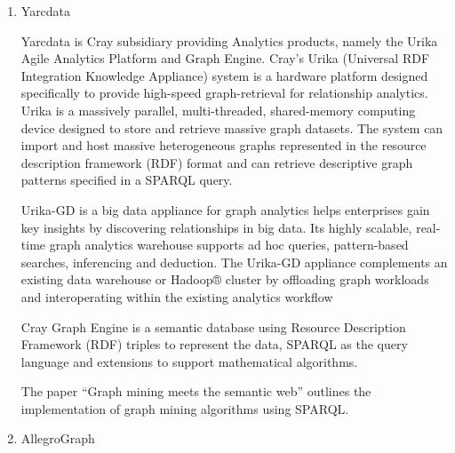 \begin{enumerate}
\item {} 
Yarcdata

Yarcdata is Cray subsidiary providing Analytics
products, namely the Urika Agile Analytics Platform and Graph
Engine. Cray’s Urika (Universal RDF Integration Knowledge
Appliance) system \label{\detokenize{i524/technologies:id455}}{\hyperref[\detokenize{i524/technologies:www-urika-appliance}]{\sphinxcrossref{{[}389{]}}}} is a hardware
platform designed specifically to provide high-speed
graph-retrieval for relationship analytics. Urika is a massively
parallel, multi-threaded, shared-memory computing device designed
to store and retrieve massive graph datasets. The system can
import and host massive heterogeneous graphs represented in the
resource description framework (RDF) format and can retrieve
descriptive graph patterns specified in a SPARQL query.

Urika-GD \label{\detokenize{i524/technologies:id456}}{\hyperref[\detokenize{i524/technologies:techspec-urika-gd}]{\sphinxcrossref{{[}390{]}}}} is a big data appliance for
graph analytics helps enterprises gain key insights by
discovering relationships in big data. Its highly scalable,
real-time graph analytics warehouse supports ad hoc queries,
pattern-based searches, inferencing and deduction. The Urika-GD
appliance complements an existing data warehouse or Hadoop®
cluster by offloading graph workloads and interoperating within
the existing analytics workflow

Cray Graph Engine \label{\detokenize{i524/technologies:id457}}{\hyperref[\detokenize{i524/technologies:paper-graph-data}]{\sphinxcrossref{{[}391{]}}}} is a semantic database
using Resource Description Framework (RDF) triples to represent
the data, SPARQL as the query language and extensions to support
mathematical algorithms.

The paper ``Graph mining meets the semantic web''
\label{\detokenize{i524/technologies:id458}}{\hyperref[\detokenize{i524/technologies:paper-lee2015graph}]{\sphinxcrossref{{[}392{]}}}} outlines the implementation of graph
mining algorithms using SPARQL.

\item {} 
AllegroGraph


\end{enumerate}
